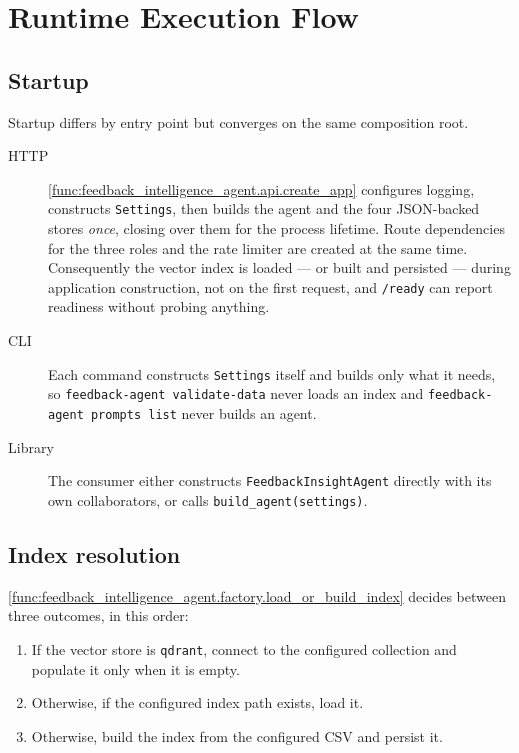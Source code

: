
\chapter{Runtime Execution Flow}
\label{ch:runtime}

\section{Startup}

Startup differs by entry point but converges on the same composition root.

\begin{description}
  \item[HTTP] \cref{func:feedback_intelligence_agent.api.create_app} configures
    logging, constructs \texttt{Settings}, then builds the agent and the four
    JSON-backed stores \emph{once}, closing over them for the process
    lifetime. Route dependencies for the three roles and the rate limiter are
    created at the same time. Consequently the vector index is loaded --- or
    built and persisted --- during application construction, not on the first
    request, and \texttt{/ready} can report readiness without probing anything.
  \item[CLI] Each command constructs \texttt{Settings} itself and builds only
    what it needs, so \texttt{feedback-agent validate-data} never loads an
    index and \texttt{feedback-agent prompts list} never builds an agent.
  \item[Library] The consumer either constructs
    \texttt{FeedbackInsightAgent} directly with its own collaborators, or calls
    \texttt{build\_agent(settings)}.
\end{description}

\section{Index resolution}

\cref{func:feedback_intelligence_agent.factory.load_or_build_index} decides
between three outcomes, in this order:

\begin{enumerate}[nosep]
  \item If the vector store is \texttt{qdrant}, connect to the configured
    collection and populate it only when it is empty.
  \item Otherwise, if the configured index path exists, load it.
  \item Otherwise, build the index from the configured CSV and persist it.
\end{enumerate}

